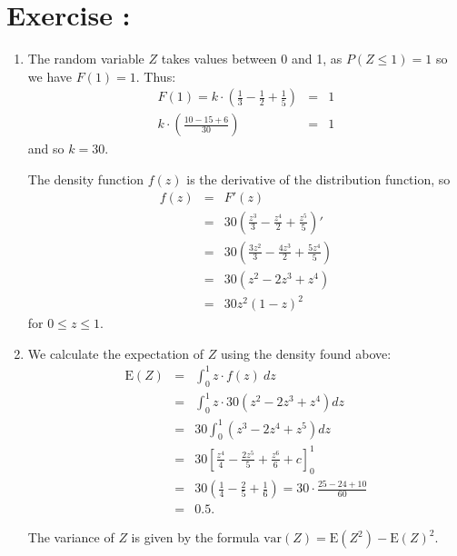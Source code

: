 \documentclass[12pt,thmsa]{article}
\begin{document}
\bigskip


\addtocounter{section}{1}
\section*{Exercise \thesection:}

\begin{enumerate}%
\item The random variable $Z$ takes values between 0 and 1, as $P( Z \le 1)=1$ so we have $F(1) = 1$. Thus:
  \begin{eqnarray*}
    F(1) = k \cdot \left( \frac{1}{3}-\frac{1}{2}+\frac{1}{5}\right) &=& 1 \\
    k \cdot \left( \frac{10-15+6}{30} \right)&=& 1%
  \end{eqnarray*}
and so $k = {30}$.

  The density function $f(z)$ is the derivative of the distribution function, so
  \begin{eqnarray*}
    f(z) &=& F'(z) \\
    &=& 30\left(\frac{z^3}{3}-\frac{z^4}{2}+\frac{z^5}{5}\right)' \\
    &=& 30\left(\frac{3z^2}{3}-\frac{4z^3}{2}+\frac{5z^4}{5}\right) \\
    &=& 30\left(z^2 - 2z^3 + z^4\right)\\
    &=& {30z^2(1-z)^2} %
  \end{eqnarray*}
for $0 \le z \le 1$.

\item We calculate the expectation of $Z$ using the density found above:
  \begin{eqnarray*}
    \text{E}(Z) &=& \int_{0}^1 z \cdot f(z) \ dz \\
    &=& \int_0^1 z \cdot 30 (z^2 - 2z^3 + z^4) dz \\
    &=& 30 \int_{0}^1 (z^3 - 2z^4 + z^5) dz \\
    &=& 30 \left[ \frac{z^4}{4} - \frac{2z^5}{5} + \frac{z^6}{6} + c 
      \right]^1_0  \\
    &=& 30 \left( \frac{1}{4} - \frac{2}{5} + \frac{1}{6} \right)
    = 30 \cdot \frac{25-24+10}{60} \\
    &=& {0.5}.   
  \end{eqnarray*}
  
 The variance of $Z$ is given by the formula $\text{var}(Z) =
 \text{E}(Z^2) -\text{E}(Z)^2$. 


\end{enumerate}
\end{document}
